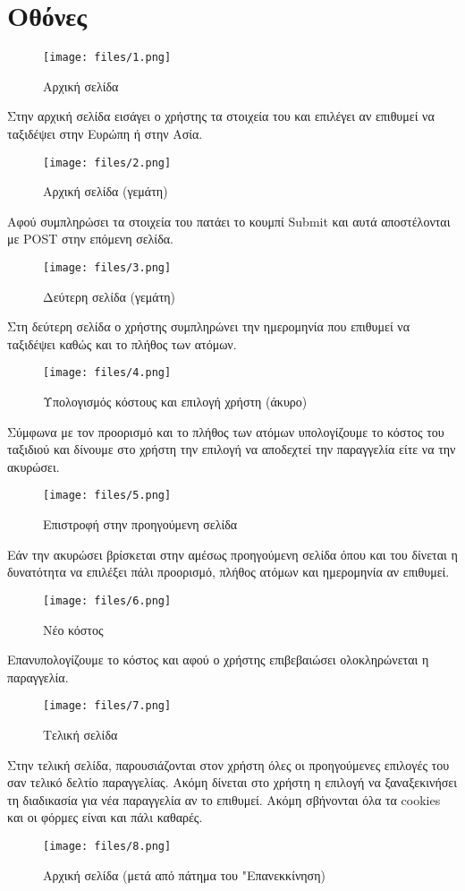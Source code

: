 \documentclass[a4paper,9pt]{article}
\begin{document}
\def\thesection {Μέρος \alph{section}}
\def\thesubsection {\roman{subsection}.}




\section{Οθόνες}
\begin{figure}[H]
    \centering
    \texttt{[image: files/1.png]}
    \caption{Αρχική σελίδα}
\end{figure}

Στην αρχική σελίδα εισάγει ο χρήστης τα στοιχεία του και επιλέγει αν επιθυμεί
να ταξιδέψει στην Ευρώπη ή στην Ασία.
\begin{figure}[H]
    \centering
    \texttt{[image: files/2.png]}
    \caption{Αρχική σελίδα (γεμάτη)}
\end{figure}

Αφού συμπληρώσει τα στοιχεία του πατάει το κουμπί Submit και αυτά αποστέλονται
με POST στην επόμενη σελίδα.
\begin{figure}[H]
    \centering
    \texttt{[image: files/3.png]}
    \caption{Δεύτερη σελίδα (γεμάτη)}
\end{figure}
Στη δεύτερη σελίδα ο χρήστης συμπληρώνει την ημερομηνία που επιθυμεί να
ταξιδέψει καθώς και το πλήθος των ατόμων.
\begin{figure}[H]
    \centering
    \texttt{[image: files/4.png]}
    \caption{Υπολογισμός κόστους και επιλογή χρήστη  (άκυρο)}
\end{figure}
Σύμφωνα με τον προορισμό και το πλήθος των ατόμων υπολογίζουμε το κόστος του
ταξιδιού και δίνουμε στο χρήστη την επιλογή να αποδεχτεί την παραγγελία είτε
να την ακυρώσει.
\begin{figure}[H]
    \centering
    \texttt{[image: files/5.png]}
    \caption{Επιστροφή στην προηγούμενη σελίδα}
\end{figure}
Εάν την ακυρώσει βρίσκεται στην αμέσως προηγούμενη σελίδα όπου και του δίνεται
η δυνατότητα να επιλέξει πάλι προορισμό, πλήθος ατόμων και ημερομηνία αν
επιθυμεί.
\begin{figure}[H]
    \centering
    \texttt{[image: files/6.png]}
    \caption{Νέο κόστος}
\end{figure}
Επανυπολογίζουμε το κόστος και αφού ο χρήστης επιβεβαιώσει ολοκληρώνεται η
παραγγελία.
\begin{figure}[H]
    \centering
    \texttt{[image: files/7.png]}
    \caption{Τελική σελίδα}
\end{figure}
Στην τελική σελίδα, παρουσιάζονται στον χρήστη όλες οι προηγούμενες επιλογές
του σαν τελικό δελτίο παραγγελίας. Ακόμη δίνεται στο χρήστη η επιλογή να
ξαναξεκινήσει τη διαδικασία για νέα παραγγελία αν το επιθυμεί.  Ακόμη
σβήνονται όλα τα cookies και οι φόρμες είναι και πάλι καθαρές.
\begin{figure}[H]
    \centering
    \texttt{[image: files/8.png]}
    \caption{Αρχική σελίδα (μετά από πάτημα του "Επανεκκίνηση)}
\end{figure}
\end{document}
